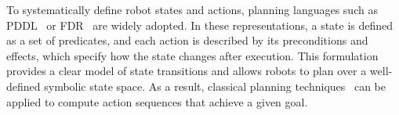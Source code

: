 To systematically define robot states and actions, planning languages such as PDDL~\cite{aeronautiques1998pddl} or FDR~\cite{helmert2009concise} are widely adopted. In these representations, a state is defined as a set of predicates, and each action is described by its preconditions and effects, which specify how the state changes after execution. This formulation provides a clear model of state transitions and allows robots to plan over a well-defined symbolic state space. As a result, classical planning techniques~\cite{hoffmann2001ff, helmert2006fast, correa2024lifted} can be applied to compute action sequences that achieve a given goal.

